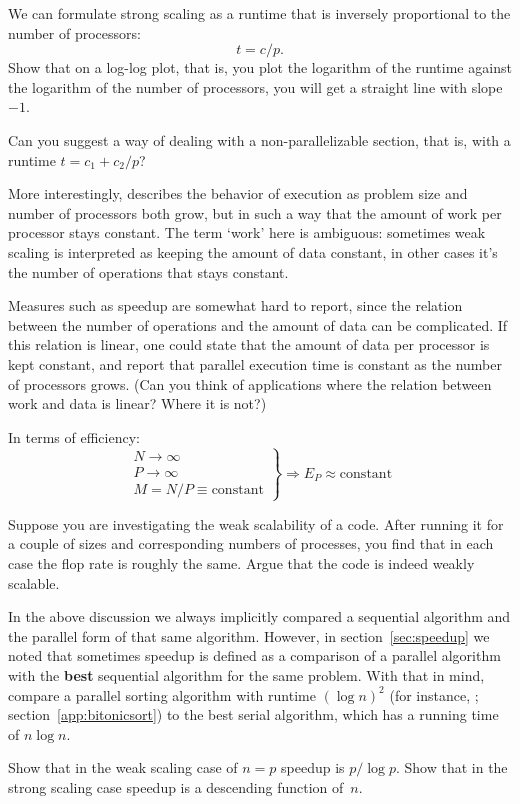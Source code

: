 \begin{exercise}
  We can formulate strong scaling as a runtime that is inversely
  proportional to the number of processors: \[ t=c/p. \]
  Show that on a log-log plot, that is, you plot the logarithm of the
  runtime against the logarithm of the number of processors,
  you will get a straight line with slope~$-1$.

  Can you suggest a way of dealing with a non-parallelizable
  section, that is, with a runtime $t=c_1+c_2/p$?
\end{exercise}

More interestingly,
describes the behavior of execution
as problem size and number of processors both grow,
but in such a way that the amount of work per processor
stays constant. 
The term `work' here is ambiguous:
sometimes weak scaling is interpreted as keeping the
amount of data constant, in other cases it's the
number of operations that stays constant.

Measures such as speedup are somewhat hard to report, since
the relation between the number of operations and the amount of data
can be complicated. If this relation is linear, one could state that
the amount of data per processor is kept constant, and report that parallel
execution time is constant as the number of processors grows.
(Can you think of applications where the relation between work and
data is linear? Where it is not?)

In terms of efficiency:
\[ \left.
\begin{array}{l}
  N\rightarrow\infty\\ P\rightarrow\infty\\ M=N/P\equiv\mathrm{constant}
\end{array}
\right\} \Rightarrow E_P\approx\mathrm{constant}
\]

\begin{exercise}
  Suppose you are investigating the weak scalability of a code.
  After running it for a couple of sizes and corresponding numbers
  of processes, you find that in each case the flop rate is roughly the same.
  Argue that the code is indeed weakly scalable.
\end{exercise}

\begin{exercise}
  In the above discussion we always implicitly compared a sequential 
  algorithm and the parallel form of that same algorithm. However, 
  in section~\ref{sec:speedup} we noted that sometimes speedup is defined
  as a comparison of a parallel algorithm with the \textbf{best} sequential
  algorithm for the same problem. With that in mind, compare a parallel sorting
  algorithm with runtime $(\log n)^2$ (for instance, ;
  section~\ref{app:bitonicsort}) to the best serial algorithm, which has 
  a running time of $n\log n$.

  Show that in the weak scaling case of $n=p$ speedup is $p/\log p$.
  Show that in the strong scaling case speedup is a descending function of~$n$.
\end{exercise}

